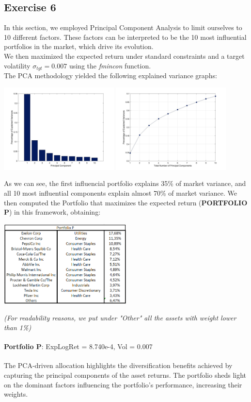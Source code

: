 \documentclass{assignment}
\begin{document}
\subsection*{Exercise 6}
In this section, we employed Principal Component Analysis to limit ourselves to 10 different factors.
These factors can be interpreted to be the 10 most influential portfolios in the market, which drive its evolution.\\
We then maximized the expected return under standard constraints and a target volatility $\sigma_{tgt} = 0.007$ using the \textit{fmincon} function.\\
The PCA methodology yielded the following explained variance graphs:
\begin{center}
    \includegraphics[width=0.45\textwidth]{assets/Hist2.jpg}
    \includegraphics[width=0.45\textwidth]{assets/Plot_7.jpg}
\end{center}
As we can see, the first influencial portfolio explains 35\% of market variance, and all 10 most influential components explain almost 70\% of market variance.
We then computed the Portfolio that maximizes the expected return (\textbf{PORTFOLIO P}) in this framework, obtaining:
\begin{center}
\includegraphics[width=0.50\textwidth]{assets/Port_P.png}
\end{center}
\textit{(For readability reasons, we put under "Other" all the assets with weight lower than 1\%)}\\\\
\textbf{Portfolio P}: ExpLogRet = 8.740e-4, Vol = 0.007\\\\
The PCA-driven allocation highlights the diversification benefits achieved by capturing the principal components of the asset returns. The portfolio sheds light  on the dominant factors influencing the portfolio's performance, increasing their weights. 
\end{document}
